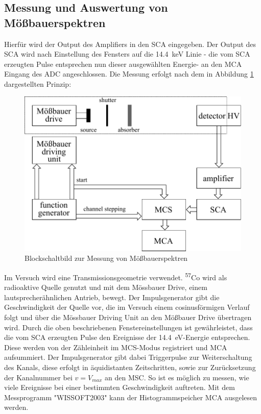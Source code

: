 \documentclass[a4paper,twoside,final]{article}
\begin{document}
\subsection{Messung und Auswertung von Mößbauerspektren}
Hierfür wird der Output des Amplifiers in den SCA eingegeben. Der Output des SCA wird nach Einstellung des Fensters auf die \SI{14,4}{\kilo\eV} Linie - die vom SCA erzeugten Pulse entsprechen nun dieser ausgewählten Energie-
an den MCA Eingang des ADC angeschlossen.
Die Messung erfolgt nach dem in Abbildung \ref{fig:BlockMoessbauerspektren} dargestellten Prinzip:
\begin{figure}[htp]\label{fig:BlockMossbauerspektren}
    \centering
    \includegraphics{Schaltungen/Blockschaltbild.pdf}
    \caption{Blockschaltbild zur Messung von Mößbauerspektren}
    \label{fig:BlockMoessbauerspektren}
\end{figure}

Im Versuch wird eine Transmissionsgeometrie verwendet. \textsuperscript{57}Co wird als radioaktive Quelle genutzt und mit dem Mössbauer Drive, einem lautsprecherähnlichen Antrieb, bewegt. Der Impulsgenerator gibt die Geschwindigkeit der Quelle vor, die im Versuch einem cosinusförmigen Verlauf folgt und über die Mössbauer Driving Unit an den Mößbauer Drive übertragen wird. Durch die oben beschriebenen Fenstereinstellungen ist gewährleistet, dass die vom SCA erzeugten Pulse den Ereignisse der \SI{14,4}{\electronvolt}-Energie entsprechen. Diese werden von der Zähleinheit im MCS-Modus registriert und MCA aufsummiert. Der Impulsgenerator gibt dabei Triggerpulse zur Weiterschaltung des Kanals, diese erfolgt in äquidistanten Zeitschritten, sowie zur Zurücksetzung der Kanalnummer bei $ v = V_{max} $ an den MSC.  So ist es möglich zu messen, wie viele Ereignisse bei einer bestimmten Geschwindigkeit auftreten. Mit dem Messprogramm "WISSOFT2003" kann der Histogrammspeicher MCA ausgelesen werden.
\end{document}
